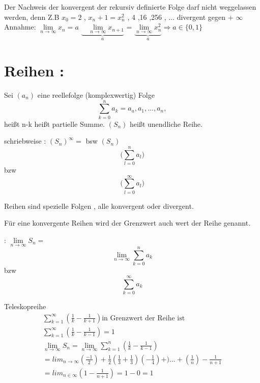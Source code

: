 \begin{remark}
Der Nachweis der konvergent der rekursiv definierte Folge darf nicht weggelassen werden, denn Z.B $x_0=2$ , $x_n+1=x_n^2$ \quad \quad {} , 4 ,16 ,256 , $\dots $ divergent gegen + $\infty$  \\

Annahme: $\lim\limits_{n \rightarrow \infty}{x_n}= a $ 
$\underbrace{\quad \lim\limits_{n \rightarrow \infty}{x_{n+1}}}_{a}$ = 
$\underbrace{\lim\limits_{n \rightarrow \infty}{x_n^2}}_{a} \Rightarrow a \in \{ 0,1 \}$
\end{remark}  

 
\newpage
\section{Reihen :}
\begin{definition}
Sei $(a_n)$ eine reellefolge (komplexwertig) Folge\\
$$\sum_{k = 0}^{n} {a_k} = a_a , a_1, \dots , a_n , $$
heißt n-k heißt partielle Summe.
$(S_n)$ heißt unendliche Reihe.

schriebweise : $(S_n)^\infty =$ bsw 
$(S_n)$ $$ \bigg( \sum_{l=0}^{n} {a_l} \bigg)$$ bzw
 $$ \bigg( \sum_{l=0}^{\infty} {a_l} \bigg)$$  
\end{definition}

\begin{remark}
Reihen sind spezielle Folgen , alle konvergent oder divergent. 
\end{remark}

\begin{definition}
Für eine konvergente Reihen wird der Grenzwert auch wert der Reihe genannt.\\

\begin{schreibweise}
 :  $\lim\limits_{n \rightarrow \infty}{S_n}= $
$$\lim\limits_{n \rightarrow \infty}{ \sum_{k=0}^{n} {a_k} }  $$ 
bzw 
$$ \sum_{k=0}^{\infty} {a_k}  $$
\end{schreibweise}

\end{definition}

\begin{example}{Teleskopreihe} 
\begin{equation}
\begin{aligned}
\sum_{k=1}^\infty(\frac{1}{k}-\frac{1}{k+1}) \text{in Grenzwert der Reihe ist}\\ 
\sum_{k=1}^\infty(\frac{1}{k}-\frac{1}{k-1})=1 \\
\lim_{n \to \infty}{S_n} = \lim_{n \to \infty}{\sum_{k=1}^n(\frac{1}{k}- \frac{1}{k-1}) }\\
= lim_{n \to \infty}{(\frac{-1}{2})+\frac{1}{2}(\frac{1}{3} + \frac{1}{3})(-\frac{1}{4})+) \dots +(\frac{1}{n})-\frac{1}{n+1}}\\
= lim_{n \in \infty}{(1- \frac{1}{n+1})}= 1-0 =1 
\end{aligned}
\end{equation}
\end{example}


